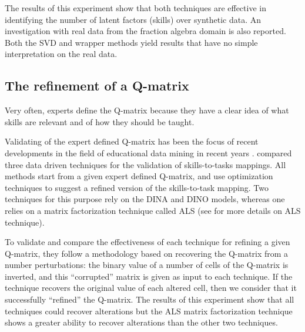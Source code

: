 The results of this experiment show that both techniques are effective in identifying the number of latent factors (skills) over synthetic data. An investigation with real data from the fraction algebra domain is also reported. Both the SVD and wrapper methods yield results that have no simple interpretation on the real data. 


\subsection{The refinement of a Q-matrix}
\label{edm2014}

Very often, experts define the Q-matrix because they have a clear idea of what skills are relevant and of how they should be taught.

Validating of the expert defined Q-matrix has been the focus of recent developments in the field of educational data mining in recent years \citep{delaTorre2008,chiu2013statistical,barnes2010novel,loye2011validite,Desmarais2013aied}. \citet{desmarais2014refinement} compared three data driven techniques for the validation of skills-to-tasks mappings.  All methods start from a given expert defined Q-matrix, and use optimization techniques to suggest a refined version of the skills-to-task mapping. Two techniques for this purpose rely on the DINA and DINO models, whereas one relies on a matrix factorization technique called ALS (see \citep{Desmarais2013aied} for more details on ALS technique). 

To validate and compare the effectiveness of each technique for refining a given Q-matrix, they follow a methodology based on recovering the Q-matrix from a number perturbations: the binary value of a number of cells of the Q-matrix is inverted, and this ``corrupted'' matrix is given as input to each technique.  If the technique recovers the original value of each altered cell, then we consider that it successfully ``refined'' the Q-matrix. The results of this experiment show that all techniques could recover alterations but the ALS matrix factorization technique shows a greater ability to recover alterations than the other two techniques.



